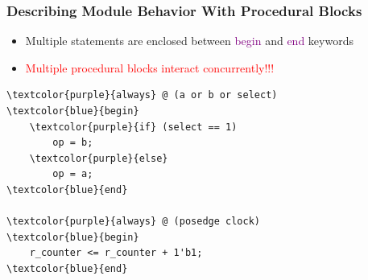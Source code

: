 \documentclass[t, notes]{beamer}
\begin{document}
\begin{frame}[fragile]
\frametitle{Describing Module Behavior With Procedural Blocks}


\begin{itemize}
\item Multiple statements are enclosed between \textcolor{purple}{begin} and \textcolor{purple}{end} keywords
\item \textcolor{red}{Multiple procedural blocks interact concurrently!!!}
\end{itemize}
\vspace{3pt}
{\scriptsize%
\begin{Verbatim}[commandchars=\\\{\}, tabsize=2]
\textcolor{purple}{always} @ (a or b or select)
\textcolor{blue}{begin}
	\textcolor{purple}{if} (select == 1)
		op = b;
	\textcolor{purple}{else}
		op = a;
\textcolor{blue}{end}

\textcolor{purple}{always} @ (posedge clock)
\textcolor{blue}{begin}
	r_counter <= r_counter + 1'b1;
\textcolor{blue}{end}
\end{Verbatim}
}

\end{frame}
\end{document}
